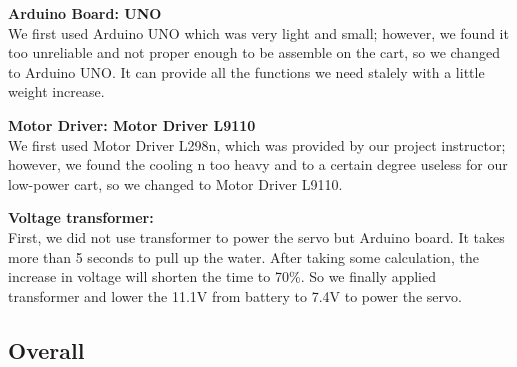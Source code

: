 \bigskip
\textbf{Arduino Board: UNO } \\
\indent
We first used Arduino UNO which was very light and small; however, we found it
too unreliable and not proper enough to be assemble on the cart, so we changed
to Arduino UNO.
It can provide all the functions we need stalely with a little weight increase.

\bigskip
\textbf{Motor Driver: Motor Driver L9110 } \\
\indent
We first used Motor Driver L298n, which was provided by our project instructor;
however, we found the cooling n too heavy and to a certain degree useless for
our low-power cart, so we changed to Motor Driver L9110.

\bigskip
\textbf{Voltage transformer:} \\
\indent
First, we did not use transformer to power the servo but Arduino board.
It takes more than 5 seconds to pull up the water.
After taking some calculation, the increase in voltage will shorten the time to
70\%.
So we finally applied transformer and lower the 11.1V from battery to 7.4V to
power the servo.

\subsection{Overall}